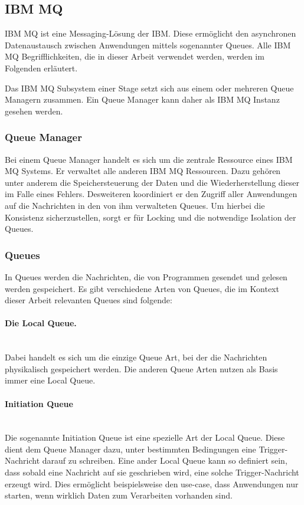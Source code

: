 \subsection{IBM MQ}\label{sec:mq}
IBM MQ ist eine Messaging-Lösung der IBM.
Diese ermöglicht den asynchronen Datenaustausch zwischen Anwendungen mittels sogenannter Queues.
Alle IBM MQ Begrifflichkeiten, die in dieser Arbeit verwendet werden, werden im Folgenden erläutert.
\cite[Kap. 3.2]{Aranha.2013}

Das IBM MQ Subsystem einer Stage setzt sich aus einem oder mehreren Queue Managern zusammen.
Ein Queue Manager kann daher als IBM MQ Instanz gesehen werden.

\subsubsection{Queue Manager}
Bei einem Queue Manager handelt es sich um die zentrale Ressource eines IBM MQ Systems.
Er verwaltet  alle anderen IBM MQ Ressourcen.
Dazu gehören unter anderem die Speichersteuerung der Daten und die Wiederherstellung dieser im Falle eines Fehlers.
Desweiteren koordiniert er den Zugriff aller Anwendungen auf die Nachrichten in den von ihm verwalteten Queues.
Um hierbei die Konsistenz sicherzustellen, sorgt er für Locking und die notwendige Isolation der Queues.
\cite[S. 36]{Aranha.2013}

\subsubsection{Queues}
In Queues werden die Nachrichten, die von Programmen gesendet und gelesen werden gespeichert.
Es gibt verschiedene Arten von Queues, die im Kontext dieser Arbeit relevanten Queues sind folgende:

\paragraph{Die Local Queue.}~\\
Dabei handelt es sich um die einzige Queue Art, bei der die Nachrichten physikalisch gespeichert werden.
Die anderen Queue Arten nutzen als Basis immer eine Local Queue.

\paragraph{Initiation Queue}~\\
Die sogenannte \glqq Initiation Queue\grqq{} ist eine spezielle Art der Local Queue.
Diese dient dem Queue Manager dazu, unter bestimmten Bedingungen eine Trigger-Nachricht darauf zu schreiben.
Eine ander Local Queue kann so definiert sein, dass sobald eine Nachricht auf sie geschrieben wird, eine solche Trigger-Nachricht erzeugt wird.
Dies ermöglicht beispielsweise den use-case, dass Anwendungen nur starten, wenn wirklich Daten zum Verarbeiten vorhanden sind.
\cite[S. 37-38]{Aranha.2013}

